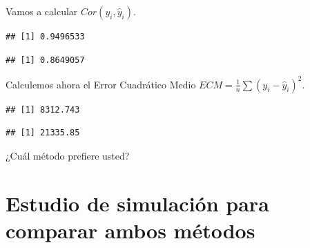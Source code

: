 \documentclass[]{book}
\makeatletter
\newenvironment{Shaded}{\begin{snugshade}}{\end{snugshade}}
\newcommand{\DecValTok}[1]{\textcolor[rgb]{0.00,0.00,0.81}{#1}}
\newcommand{\KeywordTok}[1]{\textcolor[rgb]{0.13,0.29,0.53}{\textbf{#1}}}
\newcommand{\NormalTok}[1]{#1}
\newcommand{\OperatorTok}[1]{\textcolor[rgb]{0.81,0.36,0.00}{\textbf{#1}}}
\newcommand{\StringTok}[1]{\textcolor[rgb]{0.31,0.60,0.02}{#1}}
\newenvironment{kframe}{%
\medskip{}
\setlength{\fboxsep}{.8em}
 \def\at@end@of@kframe{}%
 \ifinner\ifhmode%
  \def\at@end@of@kframe{\end{minipage}}%
  \begin{minipage}{\columnwidth}%
 \fi\fi%
 \def\FrameCommand##1{\hskip\@totalleftmargin \hskip-\fboxsep
 \colorbox{shadecolor}{##1}\hskip-\fboxsep
     \hskip-\linewidth \hskip-\@totalleftmargin \hskip\columnwidth}%
 \MakeFramed {\advance\hsize-\width
   \@totalleftmargin\z@ \linewidth\hsize
   \@setminipage}}%
 {\par\unskip\endMakeFramed%
 \at@end@of@kframe}
\renewenvironment{Shaded}{\begin{kframe}}{\end{kframe}}
\makeatother
\begin{document}
Vamos a calcular \(Cor(y_i, \hat{y}_i)\).

\begin{Shaded}
\end{Shaded}

\begin{verbatim}
## [1] 0.9496533
\end{verbatim}

\begin{Shaded}
\end{Shaded}

\begin{verbatim}
## [1] 0.8649057
\end{verbatim}

Calculemos ahora el Error Cuadrático Medio \(ECM=\frac{1}{n}\sum(y_i-\hat{y}_i)^2\).

\begin{Shaded}
\end{Shaded}

\begin{verbatim}
## [1] 8312.743
\end{verbatim}

\begin{Shaded}
\end{Shaded}

\begin{verbatim}
## [1] 21335.85
\end{verbatim}

¿Cuál método prefiere usted?

\hypertarget{estudio-de-simulacion-para-comparar-ambos-metodos}{%
\section*{Estudio de simulación para comparar ambos métodos}\label{estudio-de-simulacion-para-comparar-ambos-metodos}}
\end{document}
